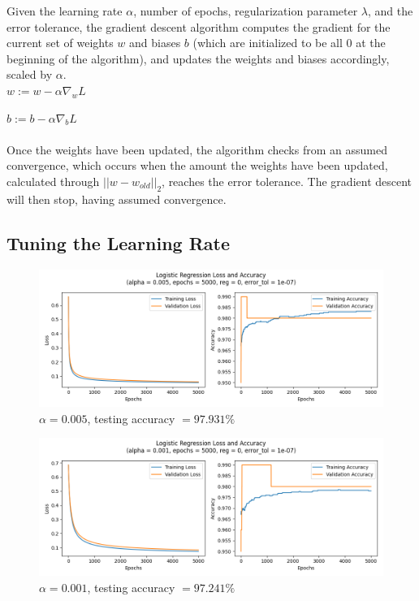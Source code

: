\documentclass[letter]{article}
\begin{document}
Given the learning rate $\alpha$, number of epochs, regularization parameter $\lambda$, and the error tolerance, the gradient descent algorithm computes the gradient for the current set of weights $w$ and biases $b$ (which are initialized to be all $0$ at the beginning of the algorithm), and updates the weights and biases accordingly, scaled by $\alpha$.\\

$w := w - \alpha \nabla_w L$

$b := b - \alpha \nabla_b L$\\\\
%
Once the weights have been updated, the algorithm checks from an assumed convergence, which occurs when the amount the weights have been updated, calculated through $||w - w_{old}||_2$, reaches the error tolerance. The gradient descent will then stop, having assumed convergence.

\subsection{Tuning the Learning Rate}

\begin{figure}[H]
	\centering
	\includegraphics[width=\linewidth]{Figure_1}
	\caption{$\alpha = 0.005$, testing accuracy $ = 97.931\%$}
	\label{fig:plot1}
\end{figure}

\begin{figure}[H]
	\centering
	\includegraphics[width=\linewidth]{Figure_2}
	\caption{$\alpha = 0.001$, testing accuracy $ = 97.241\%$}
	\label{fig:plot2}
\end{figure}
\end{document}
